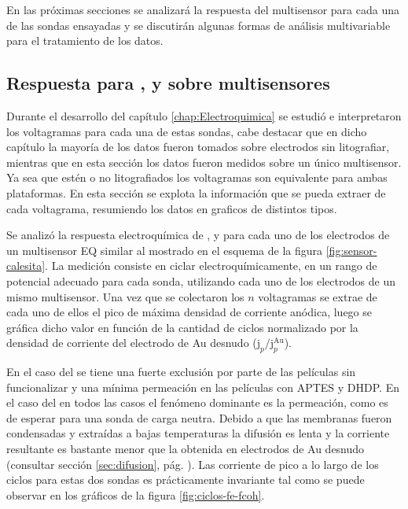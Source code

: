 			En las próximas secciones se analizará la respuesta del multisensor para cada una de las sondas ensayadas y se discutirán algunas formas de análisis multivariable para el tratamiento de los datos. 

	\subsection{Respuesta para \ru, \fe\space y \fc\space sobre multisensores}	

		Durante el desarrollo del capítulo \ref{chap:Electroquimica} se estudió e interpretaron los voltagramas para cada una de estas sondas, cabe destacar que en dicho capítulo la mayoría de los datos fueron tomados sobre electrodos sin litografiar, mientras que en esta sección los datos fueron medidos sobre un único multisensor. Ya sea que estén o no litografiados los voltagramas son equivalente para ambas plataformas. En esta sección se explota la información que se pueda extraer de cada voltagrama, resumiendo los datos en graficos de distintos tipos.

		Se analizó la respuesta electroquímica de \aminorutenio, \ferroferri\space y \ferroceno\space para cada uno de los electrodos de un multisensor EQ similar al mostrado en el esquema de la figura \ref{fig:sensor-calesita}. La medición consiste en ciclar electroquímicamente, en un rango de potencial adecuado para cada sonda, utilizando cada uno de los electrodos de un mismo multisensor. Una vez que se colectaron los $n$ voltagramas se extrae de cada uno de ellos el pico de máxima densidad de corriente anódica, luego se gráfica dicho valor en función de la cantidad de ciclos normalizado por la densidad de corriente del electrodo de Au desnudo ($\text{j}_p/\text{j}_p^\text{Au}$).
		
		En el caso del \fe\space se tiene una fuerte exclusión por parte de las películas sin funcionalizar y una mínima permeación en las películas con APTES y DHDP. 
		En el caso del \fc\space en todos las casos el fenómeno dominante es la permeación, como es de esperar para una sonda de carga neutra. Debido a que las membranas fueron condensadas y extraídas a bajas temperaturas la difusión es lenta y la corriente resultante es bastante menor que la obtenida en electrodos de Au desnudo (consultar sección \ref{sec:difusion}, pág. \pageref{sec:difusion}). Las corriente de pico a lo largo de los ciclos para estas dos sondas es prácticamente invariante tal como se puede observar en los gráficos de la figura \ref{fig:ciclos-fe-fcoh}.

